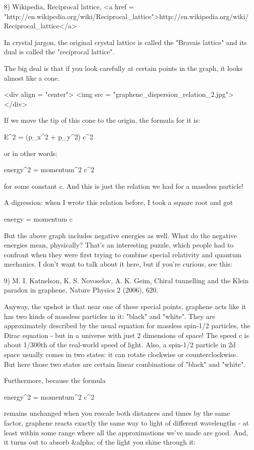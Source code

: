 8) Wikipedia, Reciprocal lattice, 
<a href = "http://en.wikipedia.org/wiki/Reciprocal_lattice">http://en.wikipedia.org/wiki/Reciprocal_lattice</a>

In crystal jargon, the original crystal lattice is called the "Bravais
lattice" and its dual is called the "reciprocal lattice".

The big deal is that if you look carefully at certain points in the
graph, it looks almost like a cone.  

<div align = "center">
<img src = "graphene_dispersion_relation_2.jpg">
</div>

If we move the tip of this cone
to the origin, the formula for it is:

E^{2} = (p_{x}^{2} + 
p_{y}^{2}) c^{2} 

or in other words:

energy^{2} = momentum^{2} c^{2}

for some constant c.  And this is just the relation we had for a
massless particle!

A digression: when I wrote this relation before, I took a square root 
and got 

energy = momentum c


But the above graph includes negative 
energies as well.  What do the negative energies mean, physically?
That's an interesting puzzle, which people had to confront when they
were first trying to combine special relativity and quantum mechanics.
I don't want to talk about it here, but if you're curious, see this:

9) M. I. Katnelson, K. S. Novoselov, A. K. Geim, Chiral tunnelling and
the Klein paradox in graphene, Nature Physics 2 (2006), 620.

Anyway, the upshot is that near one of these special points, graphene
acts like it has two kinds of massless particles in it:
"black" and "white".  They are approximately
described by the usual equation for massless spin-1/2 particles, the
Dirac equation - but in a universe with just 2 dimensions of space!
The speed c is about 1/300th of the real-world speed of light.  Also,
a spin-1/2 particle in 2d space usually comes in two states: it can
rotate clockwise or counterclockwise.  But here those two states are
certain linear combinations of "black" and "white".

Furthermore, because the formula 

energy^{2} = momentum^{2} c^{2}

remains unchanged when you rescale both distances and times by the
same factor, graphene reacts exactly the same way to light of 
different wavelengths - at least within some range where all the
approximations we've made are good.  And, it turns out to absorb
\pi &alpha; of the light you shine through it:

